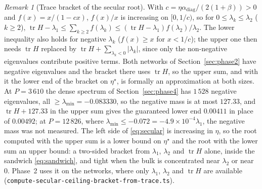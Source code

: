 \documentclass[11pt]{article}
\theoremstyle{remark}
\newtheorem{remark}[theorem]{Remark}
\newcommand{\tr}{\operatorname{tr}}
\begin{document}
\begin{remark}[Trace bracket of the secular root]\label{rem:tracebracket}
With $c=\eta\alpha_{\mathrm{diag}}/(2(1+\beta))>0$ and $f(x)=x/(1-cx)$, $f(x)/x$ is increasing on $[0,1/c)$, so for $0\le\lambda_k\le\lambda_2$ ($k\ge2$), $\tr H-\lambda_1\le\sum_{k\ge2}f(\lambda_k)\le(\tr H-\lambda_1)f(\lambda_2)/\lambda_2$. The lower inequality also holds for negative $\lambda_k$ ($f(x)\ge x$ for $x<1/c$); the upper one then needs $\tr H$ replaced by $\tr H+\sum_{\lambda_k<0}|\lambda_k|$, since only the non-negative eigenvalues contribute positive terms. Both networks of Section~\ref{sec:phase2} have negative eigenvalues and the bracket there uses $\tr H$, so the upper sum, and with it the lower end of the bracket on $\eta^\star$, is formally an approximation at both sizes. At $P=3\,610$ the dense spectrum of Section~\ref{sec:phase4} has $1\,528$ negative eigenvalues, all $\ge\lambda_{\min}=-0.083330$, so the negative mass is at most $127.33$, and $\tr H+127.33$ in the upper sum gives the guaranteed lower end $0.00411$ in place of $0.00492$; at $P=12\,826$, where $\lambda_{\min}\le-0.072=-4.9\times10^{-4}\lambda_1$, the negative mass was not measured. The left side of \eqref{eq:secular} is increasing in $\eta$, so the root computed with the upper sum is a lower bound on $\eta^\star$ and the root with the lower sum an upper bound: a two-sided bracket from $\lambda_1$, $\lambda_2$ and $\tr H$ alone, inside the sandwich \eqref{eq:sandwich}, and tight when the bulk is concentrated near $\lambda_2$ or near $0$. Phase~2 uses it on the networks, where only $\lambda_1$, $\lambda_2$ and $\tr H$ are available (\texttt{compute-secular-ceiling-bracket-from-trace.ts}).
\end{remark}
\end{document}
